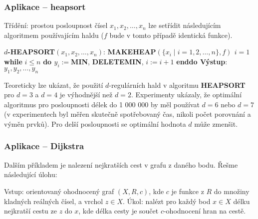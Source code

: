 \documentclass[a4paper,12pt]{article}
\newcommand{\algoritmus}[1]{
  {
  \setlength\fboxrule{0.5pt}

  \begin{boxedminipage}{0.8\textwidth}

 #1
  \end{boxedminipage}

  }
  }
\begin{document}
\subsubsection{Aplikace -- heapsort}

Třídění: prostou posloupnost 
čísel $x_1,x_2,\dots,x_n$ lze setřídit následujícím 
algoritmem použí\-vajícím haldu ($f$ bude v tomto případě 
identická funkce).

\algoritmus{
$d${\bf -HEAPSORT$(x_1,x_2,\dots,x_n)$}:\newline 
{\bf MAKEHEAP$(\{x_i\mid i=1,2,\dots,n\},f)$\newline 
$i=1$\newline 
\textsf{while}} $i\le n$ {\bf \textsf{do}\newline 
\phantom{{\rm ---}}$y_i:=$MIN}, {\bf DELETEMIN}, $i:=i+1$\newline 
{\bf \textsf{enddo}\newline 
Výstup}: $y_1,y_2,\dots,y_n$
}

Teoreticky lze ukázat, že použití $d$-regulárních hald v 
algoritmu {\bf HEAPSORT} pro $d=3$ a $d=4$ je výhodnější 
než $d=2$. Experimenty ukázaly, že optimální 
algoritmus pro posloupnosti délek do 1 000 000 by měl  
používat $d=6$ nebo $d=7$ (v experimentech byl měřen 
skutečně spotřebovaný čas, nikoli počet porovnání a 
výměn prvků). 
Pro delší posloupnosti se optimální 
hodnota $d$ může zmenšit.

\subsubsection{Aplikace -- Dijkstra}


Dalším příkladem je nalezení nejkratších cest v grafu z daného 
bodu. Řešme následující úlohu:

Vstup: orientovaný ohodnocený graf $(X,R,c)$, kde $c$ je funkce z $
R$ do množiny kladných 
reálných čísel, a vrchol $z\in X$.\newline 
Úkol: nalézt pro každý bod $x\in X$ délku 
nejkratší cestu ze $z$ do $x$, kde délka cesty je součet 
$c$-ohodnocení hran na cestě.
\end{document}
